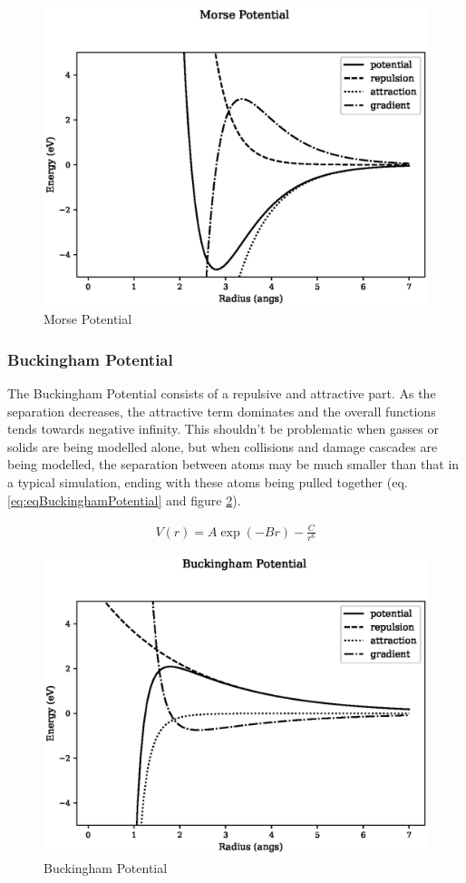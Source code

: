 \begin{figure}[!htbp]
  \begin{center}
    \includegraphics[width=.6\linewidth]{chapters/interatomic_potential_fitting/plots_pair_potentials/morse.eps}
    \caption{Morse Potential}
    \label{fig:morsepot}
  \end{center}
\end{figure}



\FloatBarrier
\subsubsection{Buckingham Potential}
\label{section:Buckingham}

The Buckingham Potential consists of a repulsive and attractive part.  As the separation decreases, the attractive term dominates and the overall functions tends towards negative infinity.  This shouldn't be problematic when gasses or solids are being modelled alone, but when collisions and damage cascades are being modelled, the separation between atoms may be much smaller than that in a typical simulation, ending with these atoms being pulled together (eq. \ref{eq:eqBuckinghamPotential} and figure \ref{fig:buckinghamplot}).

\begin{equation}
\begin{split}
V(r) = A \exp(-B  r) - \frac{C}{r^6}
\end{split}
\label{eq:eqBuckinghamPotential}
\end{equation}

\begin{figure}[!htbp]
  \begin{center}
    \includegraphics[width=.6\linewidth]{chapters/interatomic_potential_fitting/plots_pair_potentials/buckingham.eps}
    \caption{Buckingham Potential}
    \label{fig:buckinghamplot}
  \end{center}
\end{figure}



